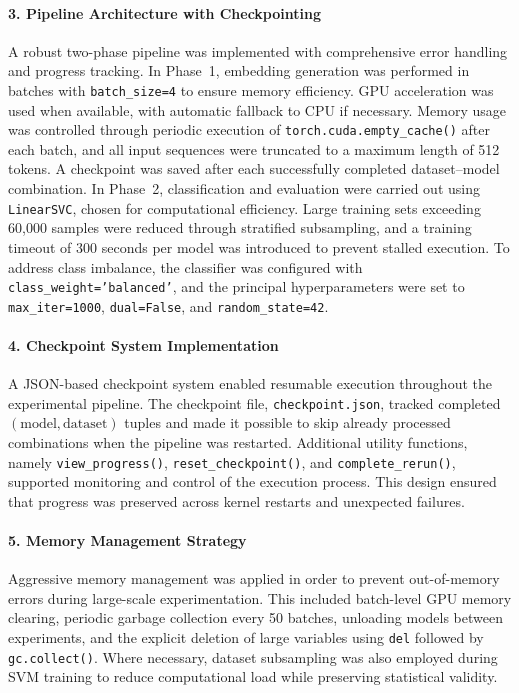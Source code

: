 \documentclass[11pt, titlepage, bibliography=totoc]{scrreprt}
\begin{document}
\paragraph{3. Pipeline Architecture with Checkpointing}
A robust two-phase pipeline was implemented with comprehensive error handling and progress tracking. In Phase~1, embedding generation was performed in batches with \texttt{batch\_size=4} to ensure memory efficiency. GPU acceleration was used when available, with automatic fallback to CPU if necessary. Memory usage was controlled through periodic execution of \texttt{torch.cuda.empty\_cache()} after each batch, and all input sequences were truncated to a maximum length of 512 tokens. A checkpoint was saved after each successfully completed dataset--model combination. In Phase~2, classification and evaluation were carried out using \texttt{LinearSVC}, chosen for computational efficiency. Large training sets exceeding 60,000 samples were reduced through stratified subsampling, and a training timeout of 300 seconds per model was introduced to prevent stalled execution. To address class imbalance, the classifier was configured with \texttt{class\_weight='balanced'}, and the principal hyperparameters were set to \texttt{max\_iter=1000}, \texttt{dual=False}, and \texttt{random\_state=42}.

\paragraph{4. Checkpoint System Implementation}
A JSON-based checkpoint system enabled resumable execution throughout the experimental pipeline. The checkpoint file, \texttt{checkpoint.json}, tracked completed \((\text{model}, \text{dataset})\) tuples and made it possible to skip already processed combinations when the pipeline was restarted. Additional utility functions, namely \texttt{view\_progress()}, \texttt{reset\_checkpoint()}, and \texttt{complete\_rerun()}, supported monitoring and control of the execution process. This design ensured that progress was preserved across kernel restarts and unexpected failures.

\paragraph{5. Memory Management Strategy}
Aggressive memory management was applied in order to prevent out-of-memory errors during large-scale experimentation. This included batch-level GPU memory clearing, periodic garbage collection every 50 batches, unloading models between experiments, and the explicit deletion of large variables using \texttt{del} followed by \texttt{gc.collect()}. Where necessary, dataset subsampling was also employed during SVM training to reduce computational load while preserving statistical validity.
\end{document}
